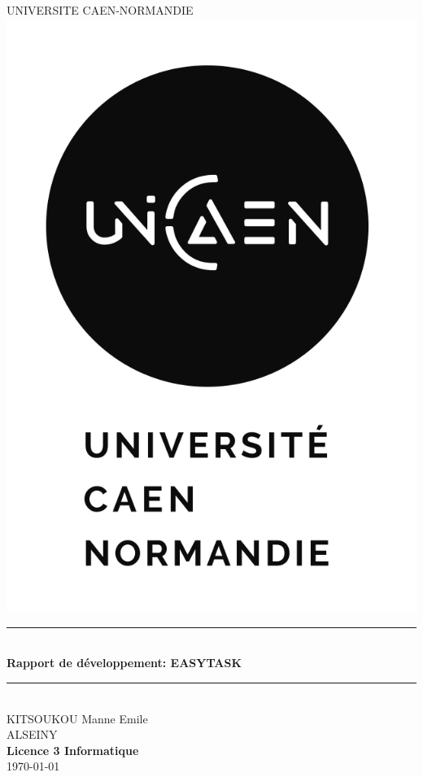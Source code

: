 \documentclass[12pt]{article}
\begin{document}
    \begin{titlepage}
        \newcommand{\HRule}{\rule{\linewidth}{0.5mm}}
        \center
        \textsc{\LARGE
        UNIVERSITE CAEN-NORMANDIE
        } \\[1cm]
        \includegraphics[scale=1]{images/LOGO-UNICAEN_V-2.2-N} \\[1cm]
        \HRule \\[0.4cm]
        { \huge \bfseries Rapport de développement: EASYTASK\\[0.15cm] }
        \HRule \\[1.5cm]
        KITSOUKOU Manne Emile\\[1cm]
        ALSEINY
        \\[1cm]
        \textbf{Licence 3 Informatique}\\
        \today \\ [1cm]
    \end{titlepage}
    \newpage
    \tableofcontents
    \newpage
\end{document}
